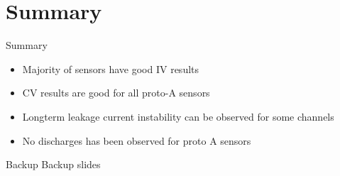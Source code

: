 \documentclass{beamer}
\begin{document}
\section{Summary}
\begin{frame}{Summary}
  \begin{itemize}
    \item Majority of sensors have good IV results
    \item CV results are good for all proto-A sensors
    \item Longterm leakage current instability can be observed  for some channels
    \item No discharges has been observed for proto A sensors
  \end{itemize}
\end{frame}

\appendix

\begin{frame}{Backup}
	\center
	\huge
	Backup slides
\end{frame}
\end{document}
